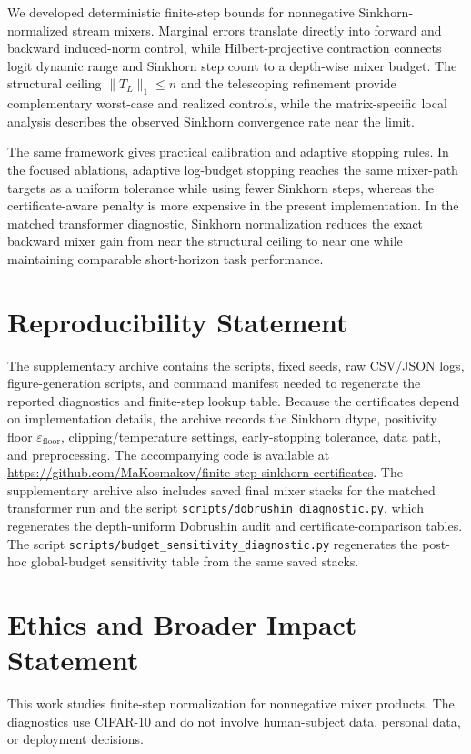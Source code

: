 \documentclass[10pt]{article}
\numberwithin{equation}{section}
\theoremstyle{plain}
\theoremstyle{definition}
\theoremstyle{remark}
\begin{document}
We developed deterministic finite-step bounds for nonnegative
Sinkhorn-normalized stream mixers. Marginal errors translate directly into
forward and backward induced-norm control, while Hilbert-projective contraction
connects logit dynamic range and Sinkhorn step count to a depth-wise mixer
budget. The structural ceiling $\|T_L\|_1\le n$ and the telescoping refinement
provide complementary worst-case and realized controls, while the matrix-specific
local analysis describes the observed Sinkhorn convergence rate near the limit.

The same framework gives practical calibration and adaptive stopping rules. In
the focused ablations, adaptive log-budget stopping reaches the same mixer-path
targets as a uniform tolerance while using fewer Sinkhorn steps, whereas the
certificate-aware penalty is more expensive in the present implementation. In
the matched transformer diagnostic, Sinkhorn normalization reduces the exact
backward mixer gain from near the structural ceiling to near one while
maintaining comparable short-horizon task performance.


\section*{Reproducibility Statement}
The supplementary archive contains the scripts, fixed seeds, raw CSV/JSON logs,
figure-generation scripts, and command manifest needed to regenerate the reported
diagnostics and finite-step lookup table. Because the certificates depend on implementation
details, the archive records the Sinkhorn dtype, positivity floor
\(\varepsilon_{\mathrm{floor}}\), clipping/temperature settings, early-stopping tolerance,
data path, and preprocessing. The accompanying code is available at
\url{https://github.com/MaKosmakov/finite-step-sinkhorn-certificates}.
The supplementary archive also includes
saved final mixer stacks for the matched transformer run
and the script \texttt{scripts/dobrushin\_diagnostic.py}, which regenerates the
depth-uniform Dobrushin audit and certificate-comparison tables. The script
\texttt{scripts/budget\_sensitivity\_diagnostic.py} regenerates the post-hoc
global-budget sensitivity table from the same saved stacks.

\section*{Ethics and Broader Impact Statement}
This work studies finite-step normalization for nonnegative mixer products. The diagnostics
use CIFAR-10 and do not involve human-subject data, personal data, or deployment decisions.
\end{document}
